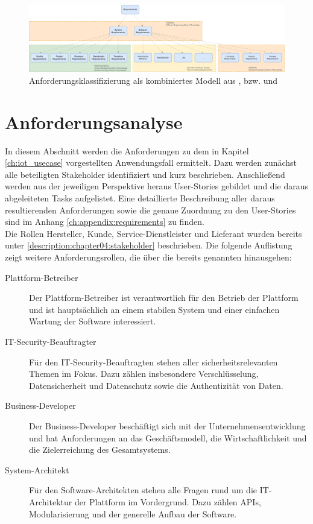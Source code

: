 \begin{figure}[htbp]
 \centering
 \includegraphics[width=1.0\textwidth]{gfx/Requirements_Hierarchy.png}
 \caption{Anforderungsklassifizierung als kombiniertes Modell aus \cite{SWEBOK}, \cite{PMBOK} bzw. \cite{BABOK} und \cite{ISO25010}}
 \label{fig:chapter05:requirements_hierarchy}
\end{figure}

%
%
\section{Anforderungsanalyse}
\label{sec:requirements:analysis}
In diesem Abschnitt werden die Anforderungen zu dem in Kapitel \ref{ch:iot_usecase} vorgestellten Anwendungsfall ermittelt. Dazu werden zunächst alle beteiligten Stakeholder identifiziert und kurz beschrieben. Anschließend werden aus der jeweiligen Perspektive heraus User-Stories gebildet und die daraus abgeleiteten Tasks aufgelistet. Eine detaillierte Beschreibung aller daraus resultierenden Anforderungen sowie die genaue Zuordnung zu den User-Stories sind im Anhang \ref{ch:appendix:requirements} zu finden.\\

Die Rollen Hersteller, Kunde, Service-Dienstleister und Lieferant wurden bereits unter \ref{description:chapter04:stakeholder} beschrieben. Die folgende Auflistung zeigt weitere Anforderungsrollen, die über die bereits genannten hinausgehen:
\begin{description}
  \item[Plattform-Betreiber] Der Plattform-Betreiber ist verantwortlich für den Betrieb der Plattform und ist hauptsächlich an einem stabilen System und einer einfachen Wartung der Software interessiert.
  \item[IT-Security-Beauftragter] Für den IT-Security-Beauftragten stehen aller sicherheitsrelevanten Themen im Fokus. Dazu zählen insbesondere Verschlüsselung, Datensicherheit und Datenschutz sowie die Authentizität von Daten.
  \item[Business-Developer] Der Business-Developer beschäftigt sich mit der Unternehmensentwicklung und hat Anforderungen an das Geschäftsmodell, die Wirtschaftlichkeit und die Zielerreichung des Gesamtsystems.
  \item[System-Architekt] Für den Software-Architekten stehen alle Fragen rund um die IT-Architektur der Plattform im Vordergrund. Dazu zählen \ac{API}s, Modularisierung und der generelle Aufbau der Software.
\end{description}


